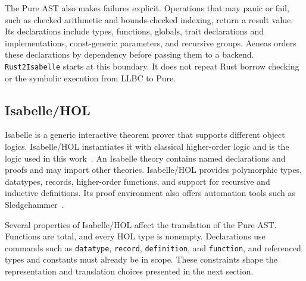 The Pure AST also makes failures explicit. Operations that may panic or fail, such as checked arithmetic and bounds-checked indexing, return a result value.
Its declarations include types, functions, globals, trait declarations and implementations, const-generic parameters, and recursive groups.
Aeneas orders these declarations by dependency before passing them to a backend.
\texttt{Rust2Isabelle} starts at this boundary. It does not repeat Rust borrow checking or the symbolic execution from LLBC to Pure.

\subsection{Isabelle/HOL}

Isabelle is a generic interactive theorem prover that supports different
object logics.
Isabelle/HOL instantiates it with classical higher-order logic and is the logic used in this work~\cite{nipkow2002isabelle}.
An Isabelle theory contains named declarations and proofs and may import other theories.
Isabelle/HOL provides polymorphic types, datatypes, records, higher-order functions, and support for recursive and inductive definitions.
Its proof environment also offers automation tools such as Sledgehammer~\cite{bohme2010sledgehammer}.

Several properties of Isabelle/HOL affect the translation of the Pure AST.
Functions are total, and every HOL type is nonempty.
Declarations use commands such as \texttt{datatype}, \texttt{record}, \texttt{definition}, and \texttt{function}, and referenced types and constants must already be in scope.
These constraints shape the representation and translation choices presented in the next section.
